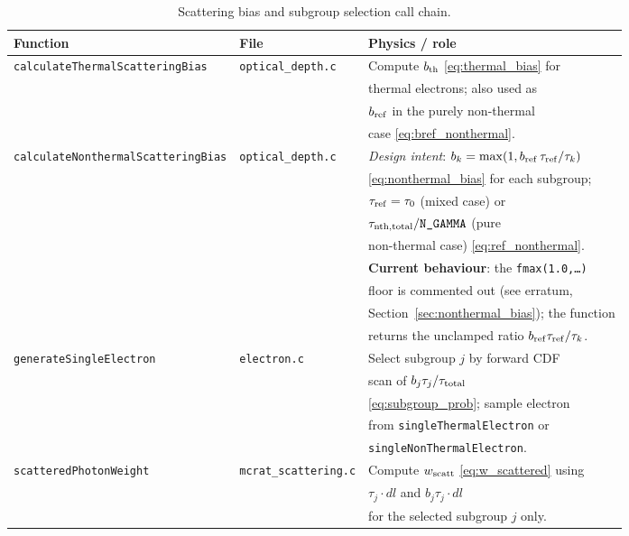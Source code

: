 \documentclass[12pt,a4paper]{article}
\newcommand{\code}[1]{\texttt{#1}}
\begin{document}
\begin{table}[h]
	\centering
	\caption{Scattering bias and subgroup selection call chain.}
	\label{tab:callchain_bias}
	\renewcommand{\arraystretch}{1.4}
	\begin{tabular}{p{} p{} p{}}
		\toprule
		\textbf{Function} & \textbf{File} & \textbf{Physics / role} \\
		\midrule
		\code{calculateThermalScatteringBias}
		& \code{optical\_depth.c}
		& Compute $b_{\rm th}$ \eqref{eq:thermal_bias} for \\
		& & thermal electrons; also used as \\
		& & $b_{\rm ref}$ in the purely non-thermal \\
		& & case \eqref{eq:bref_nonthermal}. \\
		\midrule
		\code{calculateNonthermalScatteringBias}
		& \code{optical\_depth.c}
		& \emph{Design intent}: $b_k = \max(1, b_{\rm ref}\,\tau_{\rm ref}/\tau_k)$ \\
		& & \eqref{eq:nonthermal_bias} for each subgroup; \\
		& & $\tau_{\rm ref} = \tau_0$ (mixed case) or \\
		& & $\tau_{\rm nth,total}/\code{N\_GAMMA}$ (pure \\
		& & non-thermal case) \eqref{eq:ref_nonthermal}. \\
		& & \textbf{Current behaviour}: the \code{fmax(1.0,\ldots)} \\
		& & floor is commented out (see erratum, \\
		& & Section~\ref{sec:nonthermal_bias}); the function \\
		& & returns the unclamped ratio $b_{\rm ref}\tau_{\rm ref}/\tau_k$. \\
		\midrule
		\code{generateSingleElectron}
		& \code{electron.c}
		& Select subgroup $j$ by forward CDF \\
		& & scan of $b_j\tau_j/\tau_{\rm total}$ \\
		& & \eqref{eq:subgroup_prob}; sample electron \\
		& & from \code{singleThermalElectron} or \\
		& & \code{singleNonThermalElectron}. \\
		\midrule
		\code{scatteredPhotonWeight}
		& \code{mcrat\_scattering.c}
		& Compute $w_{\rm scatt}$ \eqref{eq:w_scattered} using \\
		& & $\tau_j \cdot dl$ and $b_j\tau_j \cdot dl$ \\
		& & for the selected subgroup $j$ only. \\
		\bottomrule
	\end{tabular}
\end{table}
\end{document}
